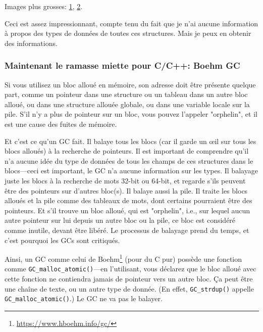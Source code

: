 Images plus grosses:
\href{\RepoURL/advanced/450_more_ptrs/oracle1.png}{1},
\href{\RepoURL/advanced/450_more_ptrs/oracle2.png}{2}.

Ceci est assez impressionnant, compte tenu du fait que je n'ai aucune information
à propos des types de données de toutes ces structures.
Mais je peux en obtenir des informations.

\subsubsection{Maintenant le ramasse miette pour C/C++: Boehm GC}

Si vous utilisez un bloc alloué en mémoire, son adresse doit être présente quelque
part, comme un pointeur dans une structure ou un tableau dans un autre bloc alloué,
ou dans une structure allouée globale, ou dans une variable locale sur la pile.
S'il n'y a plus de pointeur sur un bloc, vous pouvez l'appeler "orphelin", et il
est une cause des fuites de mémoire.

Et c'est ce qu'un \ac{GC} fait.
Il balaye tous les blocs (car il garde un \oe{}il sur tous les blocs alloués) à
la recherche de pointeurs.
Il est important de comprendre qu'il n'a aucune idée du type de données de tous les
champs de ces structures dans le blocs---ceci est important, le \ac{GC} n'a aucune information
sur les types.
Il balayage juste les blocs à la recherche de mots 32-bit ou 64-bit, et regarde s'ils
peuvent être des pointeurs sur d'autres bloc(s).
Il balaye aussi la pile.
Il traite les blocs alloués et la pile comme des tableaux de mots, dont certains pourraient
être des pointeurs.
Et s'il trouve un bloc alloué, qui est "orphelin", i.e., sur lequel aucun autre pointeur
sur lui depuis un autre bloc ou la pile, ce bloc est considéré comme inutile, devant
être libéré.
Le processus de balayage prend du temps, et c'est pourquoi les \ac{GC}s sont critiqués.

Ainsi, un \ac{GC} comme celui de Boehm\footnote{\url{https://www.hboehm.info/gc/}}
(pour du C pur) possède une fonction comme \verb|GC_malloc_atomic()|---en l'utilisant,
vous  déclarez que le bloc alloué avec cette fonction ne contiendra jamais de pointeur
vers un autre bloc.
Ça peut être une chaîne de texte, ou un autre type de donnée.
(En effet, \verb|GC_strdup()| appelle \verb|GC_malloc_atomic()|.)
Le \ac{GC} ne va pas le balayer.

